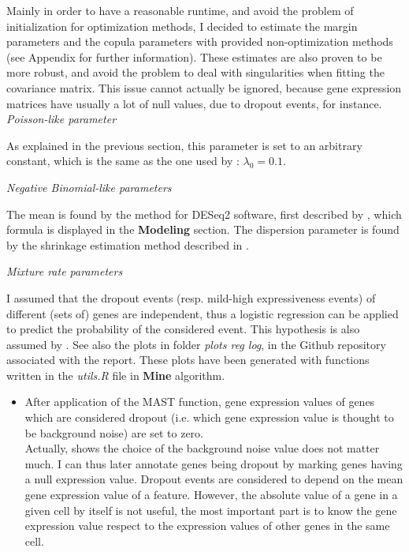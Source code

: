 \documentclass{report}
\begin{document}
{Mainly in order to have a reasonable runtime, and avoid the problem of initialization for optimization methods, I decided to estimate the margin parameters and the copula parameters with provided non-optimization methods\cite{yu2013shrinkage}\cite{schafer2005shrinkage} (see Appendix for further information). These estimates are also proven to be more robust, and avoid the problem to deal with singularities when fitting the covariance matrix. This issue cannot actually be ignored, because gene expression matrices have usually a lot of null values, due to dropout events, for instance.\\

\bigskip
\noindent \textit{Poisson-like parameter}
\bigskip

As explained in the previous section, this parameter is set to an arbitrary constant, which is the same as the one used by \cite{kharchenko2014bayesian}: $\lambda_0 = 0.1$.

\bigskip
\noindent \textit{Negative Binomial-like parameters}
\bigskip

The mean is found by the method for DESeq2 software, first described by \cite{anders2010differential}, which formula is displayed in the \textbf{Modeling} section. The dispersion parameter is found by the shrinkage estimation method described in \cite{yu2013shrinkage}.

\bigskip
\noindent \textit{Mixture rate parameters}
\bigskip

I assumed that the dropout events (resp. mild-high expressiveness events) of different (sets of) genes are independent, thus a logistic regression can be applied to predict the probability of the considered event\cite{andersonLogistic}\cite{petersLecture}\cite{frostWhy}. This hypothesis is also assumed by \cite{kharchenko2014bayesian}. See also the plots in folder \emph{plots reg log}, in the Github repository associated with the report. These plots have been generated with functions written in the \emph{utils.R} file in \textbf{Mine} algorithm.\\

\begin{itemize}
\item After application of the MAST function, gene expression values of genes which are considered dropout (i.e. which gene expression value is thought to be background noise) are set to zero.\\

Actually, \cite{finak2015mast} shows the choice of the background noise value does not matter much. I can thus later annotate genes being dropout by marking genes having a null expression value. Dropout events are considered to depend on the mean gene expression value of a feature\cite{kharchenko2014bayesian}. However, the absolute value of a gene in a given cell by itself is not useful, the most important part is to know the gene expression value respect to the expression values of other genes in the same cell.\\


\end{itemize}}
\end{document}
